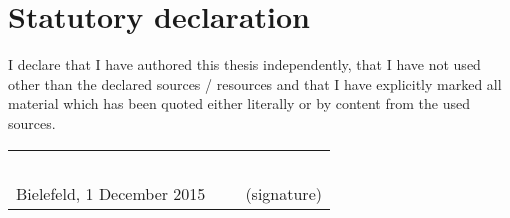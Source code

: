 \chapter{Statutory declaration}

  I declare that I have authored this thesis independently, that I have not used other than the declared sources / resources and that I have explicitly marked all material which has been quoted either literally or by content from the used sources. 

 
\vspace*{1.5\baselineskip}

  \begin{table}[ht!]
        \begin{tabular}{p{150pt}p{150pt}p{100pt}}
           ~ & ~ & ~ \\ \cline{1-1} \cline{3-3}
          Bielefeld, 1 December 2015 & ~ & \centering(signature) \\
        \end{tabular}
  \end{table}
%
%  
